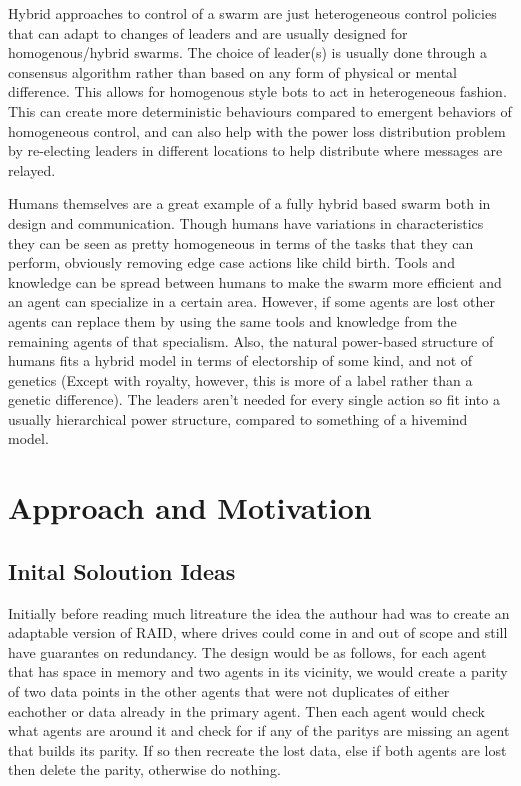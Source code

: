 \documentclass{UoYCSproject}
\begin{document}
Hybrid approaches to control of a swarm are just heterogeneous control policies that can adapt to changes of leaders and are usually designed for homogenous/hybrid swarms. 
The choice of leader(s) is usually done through a consensus algorithm \cite{Paxos} rather than based on any form of physical or mental difference. 
This allows for homogenous style bots to act in heterogeneous fashion. 
This can create more deterministic behaviours compared to emergent behaviors of homogeneous control, and can also help with the power loss distribution problem by re-electing leaders in different locations to help distribute where messages are relayed.

Humans themselves are a great example of a fully hybrid based swarm both in design and communication. 
Though humans have variations in characteristics they can be seen as pretty homogeneous in terms of the tasks that they can perform, obviously removing edge case actions like child birth. 
Tools and knowledge can be spread between humans to make the swarm more efficient and an agent can specialize in a certain area. 
However, if some agents are lost other agents can replace them by using the same tools and knowledge from the remaining agents of that specialism. 
Also, the natural power-based structure of humans fits a hybrid model in terms of electorship of some kind, and not of genetics (Except with royalty, however, this is more of a label rather than a genetic difference). 
The leaders aren't needed for every single action so fit into a usually hierarchical power structure, compared to something of a hivemind model.


\chapter{Approach and Motivation}
\label{cha:Approach and Motivation}

\section{Inital Soloution Ideas}
\label{sec:Inital Soloution Ideas}

Initially before reading much litreature the idea the authour had was to create an adaptable version of RAID, where drives could come in and out of scope and still have guarantes on redundancy.
The design would be as follows, for each agent that has space in memory and two agents in its vicinity, we would create a parity of two data points in the other agents that were not duplicates of either eachother or data already in the primary agent.
Then each agent would check what agents are around it and check for if any of the paritys are missing an agent that builds its parity.
If so then recreate the lost data, else if both agents are lost then delete the parity, otherwise do nothing.
\end{document}

